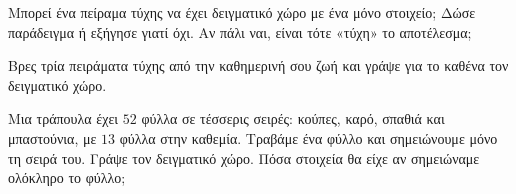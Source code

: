 \ex Μπορεί ένα πείραμα τύχης να έχει δειγματικό χώρο με ένα μόνο στοιχείο; Δώσε παράδειγμα ή εξήγησε γιατί όχι. Αν πάλι ναι, είναι τότε «τύχη» το αποτέλεσμα;


\ex Βρες τρία πειράματα τύχης από την καθημερινή σου ζωή και γράψε για το καθένα τον δειγματικό χώρο.

\ex Μια τράπουλα έχει $52$ φύλλα σε τέσσερις σειρές: κούπες, καρό, σπαθιά και μπαστούνια, με $13$ φύλλα στην καθεμία. Τραβάμε ένα φύλλο και σημειώνουμε μόνο τη σειρά του. Γράψε τον δειγματικό χώρο. Πόσα στοιχεία θα είχε αν σημειώναμε ολόκληρο το φύλλο;
